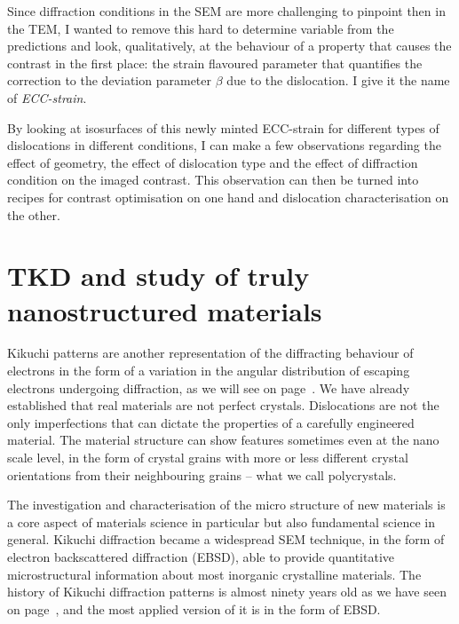 Since diffraction conditions in the SEM are more challenging to pinpoint then in the TEM, I wanted to remove this hard to determine variable from the predictions and look, qualitatively, at the behaviour of a property that causes the contrast in the first place: the strain flavoured parameter that quantifies the correction to the deviation parameter $\beta$ due to the dislocation. I give it the name of \textit{ECC-strain}. 

By looking at isosurfaces of this newly minted ECC-strain for different types of dislocations in different conditions, I can make a few observations regarding the effect of geometry, the effect of dislocation type and the effect of diffraction condition on the imaged contrast. This observation can then be turned into recipes for contrast optimisation on one hand and dislocation characterisation on the other.



\section{TKD and study of truly nanostructured materials}





Kikuchi patterns are another representation of the diffracting behaviour of electrons in the form of a variation in the angular distribution of escaping electrons undergoing diffraction, as we will see on page~\pageref{sec:Kikuchi}. We have already established that real materials are not perfect crystals. Dislocations are not the only imperfections that can dictate the properties of a carefully engineered material. The material structure can show features sometimes even at the nano scale level, in the form of crystal grains with more or less different crystal orientations from their neighbouring grains -- what we call polycrystals. 

The investigation and characterisation of the micro structure of new materials is a core aspect of materials science in particular but also fundamental science in general. Kikuchi diffraction became a widespread SEM technique, in the form of electron backscattered diffraction (EBSD), able to provide quantitative microstructural information about most inorganic crystalline materials. The history of Kikuchi diffraction patterns is almost ninety years old as we have seen on page~\pageref{table:historyDiff}, and the most applied version of it is in the form of EBSD.


